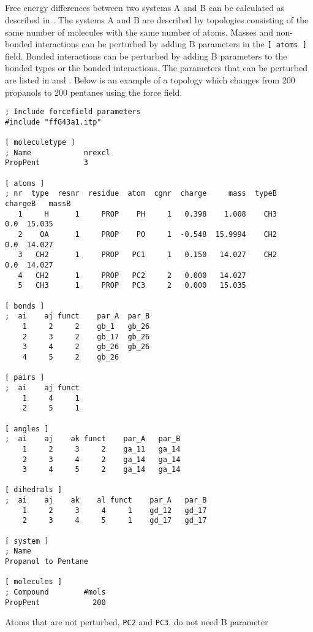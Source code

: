 \subsection{}

Free energy differences between two systems A and B can be calculated as
described in . The systems A and B are described by topologies
consisting of the same number of molecules with the same number of
atoms. Masses and non-bonded interactions can be perturbed by adding B
parameters in the {\tt [~atoms~]} field. Bonded interactions can be 
perturbed by adding B parameters to the bonded types or the bonded
interactions. The parameters that can be perturbed are listed in  
 and .
Below is an example of a topology which changes from 200 propanols to
200 pentanes using the  force field.
{\small\begin{verbatim}
; Include forcefield parameters
#include "ffG43a1.itp"

[ moleculetype ]
; Name            nrexcl
PropPent          3

[ atoms ]
; nr  type  resnr  residue  atom  cgnr  charge     mass  typeB  chargeB   massB
   1     H      1     PROP    PH     1   0.398    1.008    CH3      0.0  15.035
   2    OA      1     PROP    PO     1  -0.548  15.9994    CH2      0.0  14.027
   3   CH2      1     PROP   PC1     1   0.150   14.027    CH2      0.0  14.027
   4   CH2      1     PROP   PC2     2   0.000   14.027
   5   CH3      1     PROP   PC3     2   0.000   15.035

[ bonds ]
;  ai    aj funct    par_A  par_B 
    1     2     2    gb_1   gb_26
    2     3     2    gb_17  gb_26
    3     4     2    gb_26  gb_26
    4     5     2    gb_26

[ pairs ]
;  ai    aj funct
    1     4     1
    2     5     1

[ angles ]
;  ai    aj    ak funct    par_A   par_B
    1     2     3     2    ga_11   ga_14
    2     3     4     2    ga_14   ga_14
    3     4     5     2    ga_14   ga_14

[ dihedrals ]
;  ai    aj    ak    al funct    par_A   par_B
    1     2     3     4     1    gd_12   gd_17
    2     3     4     5     1    gd_17   gd_17

[ system ]
; Name
Propanol to Pentane

[ molecules ]
; Compound        #mols
PropPent            200
\end{verbatim}}
Atoms that are not perturbed, {\tt PC2} and {\tt PC3}, do not need B parameter
